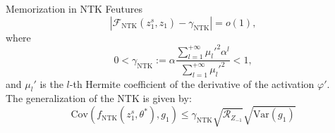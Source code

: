 \documentclass[serif, aspectratio=169]{beamer}
\begin{document}
\begin{frame}{Memorization in NTK Feutures}
    \[
    \left| \mathcal{F}_{\text{NTK}}(z_1^s, z_1) - \gamma_{\text{NTK}} \right| = o(1),
    \]
    where 
    \[
    0 < \gamma_{\text{NTK}} := \alpha \frac{\sum_{l=1}^{+\infty} \mu_l'^2 \alpha^l}{\sum_{l=1}^{+\infty} \mu_l'^2} < 1, \tag{26}
    \]
    and $\mu_l'$ is the $l$-th Hermite coefficient of the derivative of the activation $\varphi'$.\\
    The generalization of the NTK is given by:
    \[
        \text{Cov}\left(f_{\text{NTK}}(z_1^s, \theta^*), g_1\right) \leq \gamma_{\text{NTK}} \sqrt{\mathcal{R}_{Z_{-1}}} \sqrt{\text{Var}(g_1)}
    \]
\end{frame}
\end{document}
